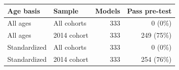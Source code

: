 \begin{tabular}{@{}ll rr@{}}
\toprule
Age basis & Sample & Models & Pass pre-test \\
\midrule
All ages & All cohorts & 333 & 0 (0\%) \\
All ages & 2014 cohort & 333 & 249 (75\%) \\
Standardized & All cohorts & 333 & 0 (0\%) \\
Standardized & 2014 cohort & 333 & 254 (76\%) \\
\bottomrule
\end{tabular}
